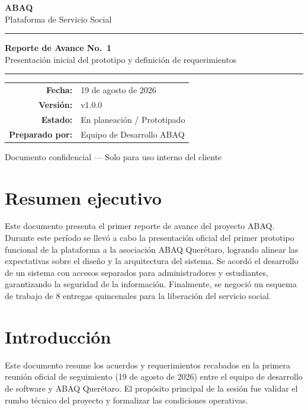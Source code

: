 \textbf{ABAQ}\\
Plataforma de Servicio Social

\begin{center}\rule{0.5\linewidth}{0.5pt}\end{center}

\textbf{Reporte de Avance No.~1}\\
Presentación inicial del prototipo y definición de requerimientos

\begin{center}\rule{0.5\linewidth}{0.5pt}\end{center}

{\def\LTcaptype{none} %
\begin{longtable}[]{@{}rl@{}}
\toprule\noalign{}
\endhead
\bottomrule\noalign{}
\endlastfoot
\textbf{Fecha:} & 19 de agosto de 2026 \\
\textbf{Versión:} & v1.0.0 \\
\textbf{Estado:} & En planeación / Prototipado \\
\textbf{Preparado por:} & Equipo de Desarrollo ABAQ \\
\end{longtable}
}

Documento confidencial --- Solo para uso interno del cliente

\section*{Resumen ejecutivo}\label{resumen-ejecutivo}

Este documento presenta el primer reporte de avance del proyecto ABAQ.
Durante este período se llevó a cabo la presentación oficial del primer
prototipo funcional de la plataforma a la asociación ABAQ Querétaro,
logrando alinear las expectativas sobre el diseño y la arquitectura del
sistema. Se acordó el desarrollo de un sistema con accesos separados
para administradores y estudiantes, garantizando la seguridad de la
información. Finalmente, se negoció un esquema de trabajo de 8 entregas
quincenales para la liberación del servicio social.

\section{Introducción}\label{introducciuxf3n}

Este documento resume los acuerdos y requerimientos recabados en la
primera reunión oficial de seguimiento (19 de agosto de 2026) entre el
equipo de desarrollo de software y ABAQ Querétaro. El propósito
principal de la sesión fue validar el rumbo técnico del proyecto y
formalizar las condiciones operativas.

